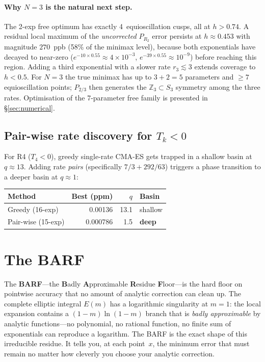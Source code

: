\documentclass[12pt]{article}
\begin{document}
\paragraph{Why $N=3$ is the natural next step.}
The 2-exp free optimum has exactly 4~equioscillation cusps, all at $h > 0.74$.
A residual local maximum of the \emph{uncorrected} $P_{R_2}$ error persists at
$h \approx 0.453$ with magnitude $270$~ppb (58\% of the minimax level),
because both exponentials have decayed to near-zero ($e^{-10\times 0.55}\approx 4\times10^{-3}$,
$e^{-39\times 0.55}\approx10^{-9}$) before reaching this region.
Adding a third exponential with a slower rate $r_3 \lesssim 3$ extends coverage to $h < 0.5$.
For $N=3$ the true minimax has up to $3{+}2=5$ parameters and $\geq 7$ equioscillation
points; $P_{2/3}$ then generates the $\mathbb{Z}_3\subset S_3$ symmetry among the
three rates.  Optimisation of the 7-parameter free family is presented in
\S\ref{sec:numerical}.

\subsection{Pair-wise rate discovery for $T_k < 0$}\label{sec:pairwise}

For R4 ($T_4 < 0$), greedy single-rate CMA-ES gets trapped in a shallow basin at $q \approx 13$.
Adding rate \emph{pairs} (specifically $7/3 + 292/63$) triggers a phase transition to a deeper basin at $q \approx 1$:

\begin{center}
\begin{tabular}{lrrl}
\toprule
Method & Best (ppm) & $q$ & Basin \\
\midrule
Greedy (16-exp) & 0.00136 & 13.1 & shallow \\
Pair-wise (15-exp) & 0.000786 & 1.5 & \textbf{deep} \\
\bottomrule
\end{tabular}
\end{center}

\section{The BARF}\label{sec:barf}

The \textbf{BARF}---the \textbf{B}adly \textbf{A}pproximable \textbf{R}esidue \textbf{F}loor---is the hard floor on pointwise accuracy that no amount of analytic correction can clean up.  The complete elliptic integral $E(m)$ has a logarithmic singularity at $m=1$: the local expansion contains a $(1{-}m)\ln(1{-}m)$ branch that is \emph{badly approximable} by analytic functions---no polynomial, no rational function, no finite sum of exponentials can reproduce a logarithm.  The BARF is the exact shape of this irreducible residue.  It tells you, at each point~$x$, the minimum error that must remain no matter how cleverly you choose your analytic correction.
\end{document}
